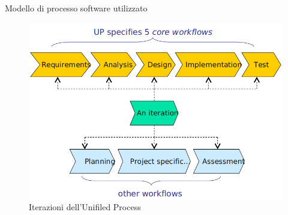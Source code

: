 \documentclass[t]{beamer} %
\begin{document}
 \begin{frame} {Modello di processo software utilizzato}
   \begin{figure}
     \includegraphics[scale=0.30]{image/Up_Iteration_Workflows.png}{\centering}
    \caption{Iterazioni dell'Unifiled Process} 
    \label{fig_UIW}
   \end{figure}
  \end{frame}
\end{document}
